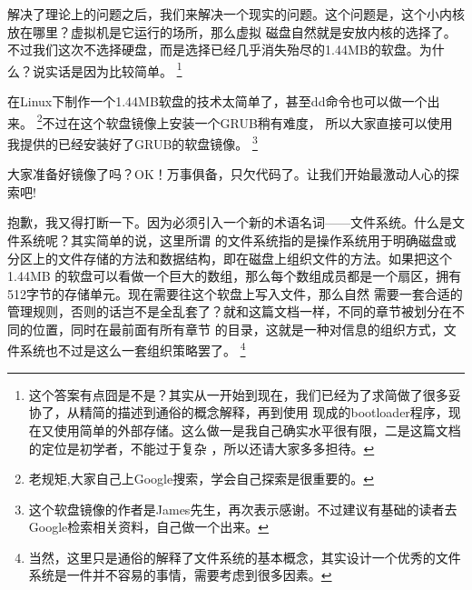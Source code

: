 \par 解决了理论上的问题之后，我们来解决一个现实的问题。这个问题是，这个小内核放在哪里？虚拟机是它运行的场所，那么虚拟\allowbreak
磁盘自然就是安放内核的选择了。不过我们这次不选择硬盘，而是选择已经几乎消失殆尽的1.44MB的软盘。为什么？说实话是因为比较简单。\allowbreak
\footnote{这个答案有点囧是不是？其实从一开始到现在，我们已经为了求简做了很多妥协了，从精简的描述到通俗的概念解释，再到使用\allowbreak
现成的bootloader程序，现在又使用简单的外部存储。这么做一是我自己确实水平很有限，二是这篇文档的定位是初学者，不能过于复杂\allowbreak
，所以还请大家多多担待。}

\par 在Linux下制作一个1.44MB软盘的技术太简单了，甚至dd命令也可以做一个出来。\allowbreak
\footnote{老规矩,大家自己上Google搜索，学会自己探索是很重要的。}不过在这个软盘镜像上安装一个GRUB稍有难度，\allowbreak
所以大家直接可以使用我提供的已经安装好了GRUB的软盘镜像。\allowbreak
\footnote{这个软盘镜像的作者是James先生，再次表示感谢。不过建议有基础的读者去Google检索相关资料，自己做一个出来。}

\par 大家准备好镜像了吗？OK！万事俱备，只欠代码了。让我们开始最激动人心的探索吧!
\par 抱歉，我又得打断一下。因为必须引入一个新的术语名词——文件系统。什么是文件系统呢？其实简单的说，这里所谓\allowbreak
的文件系统指的是操作系统用于明确磁盘或分区上的文件存储的方法和数据结构，即在磁盘上组织文件的方法。如果把这个1.44MB\allowbreak
的软盘可以看做一个巨大的数组，那么每个数组成员都是一个扇区，拥有512字节的存储单元。现在需要往这个软盘上写入文件，那么自然\allowbreak
需要一套合适的管理规则，否则的话岂不是全乱套了？就和这篇文档一样，不同的章节被划分在不同的位置，同时在最前面有所有章节\allowbreak
的目录，这就是一种对信息的组织方式，文件系统也不过是这么一套组织策略罢了。\allowbreak
\footnote{当然，这里只是通俗的解释了文件系统的基本概念，其实设计一个优秀的文件系统是一件并不容易的事情，需要考虑到很多因素。}

